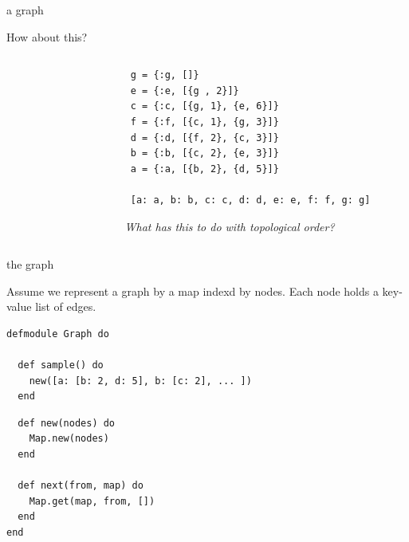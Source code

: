 \begin{frame}[fragile]{a graph}

How about this?

\begin{columns}
 \begin{column}{0.4\linewidth}
\begin{figure}
\end{figure}
 \end{column}
 \begin{column}{0.6\linewidth}
\begin{verbatim}
 g = {:g, []}
 e = {:e, [{g , 2}]}
 c = {:c, [{g, 1}, {e, 6}]}
 f = {:f, [{c, 1}, {g, 3}]}
 d = {:d, [{f, 2}, {c, 3}]}
 b = {:b, [{c, 2}, {e, 3}]}
 a = {:a, [{b, 2}, {d, 5}]}

 [a: a, b: b, c: c, d: d, e: e, f: f, g: g]
 \end{verbatim}
\pause
{\em What has this to do with topological order?}
\end{column}
\end{columns}

\end{frame}


\begin{frame}[fragile]{the graph}

  Assume we represent a graph by a map indexd by nodes. Each node holds a key-value list of edges.

\begin{verbatim}
defmodule Graph do

  def sample() do
    new([a: [b: 2, d: 5], b: [c: 2], ... ])
  end
\end{verbatim}

\begin{verbatim}
  def new(nodes) do
    Map.new(nodes)
  end

  def next(from, map) do
    Map.get(map, from, [])
  end
end
\end{verbatim}

\end{frame}

